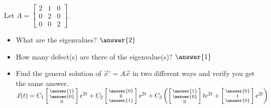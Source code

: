 \documentclass{ximera}
\begin{document}
\begin{exercise}
    Let
    $A = 
    \left[ 
        \begin{smallmatrix} 
            2 & 1 & 0 \\ 
            0 & 2 & 0 \\ 
            0 & 0 & 2 
        \end{smallmatrix} 
    \right]$.
    \begin{itemize}
        \item What are the eigenvalues? $\answer{2}$
        \item How many defect(s) are there of the eigenvalue(s)? $\answer{1}$
        \item Find the general solution of ${\vec{x}}' = A \vec{x}$ in two different ways and verify you get the same answer.\\
            $\vec{x}(t) = C_1 \left[\begin{smallmatrix} \answer{1} \\ \answer{0} \\ 0 \end{smallmatrix}\right]e^{2t} + C_2\left[\begin{smallmatrix} \answer{0} \\ 0 \\ \answer{1} \end{smallmatrix}\right]e^{2t} + C_3\left(\left[\begin{smallmatrix} \answer{1} \\ \answer{0} \\ 0 \end{smallmatrix}\right]te^{2t} + \left[\begin{smallmatrix} \answer{0} \\ 1 \\ \answer{0} \end{smallmatrix}\right]e^{2t}\right)$
    \end{itemize}
\end{exercise}
\end{document}
